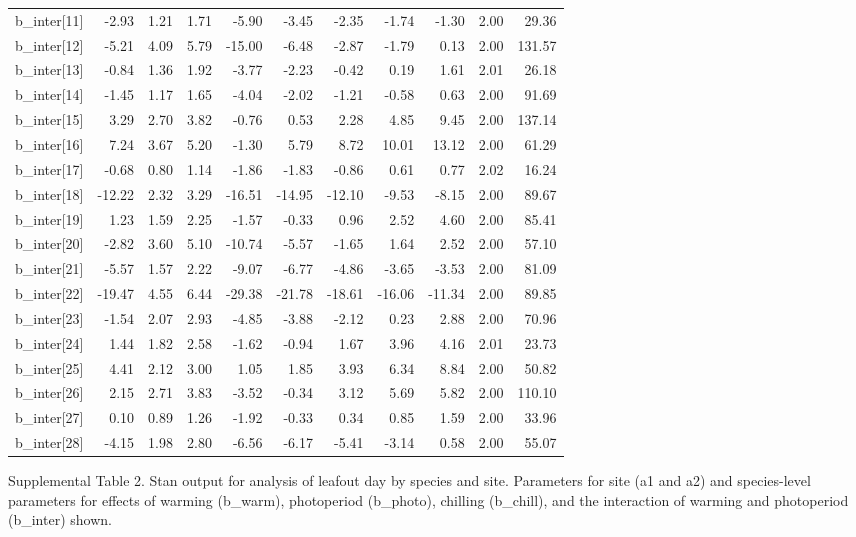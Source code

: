\documentclass[11pt]{article}
\begin{document}
\begin{table}[ht]
\begin{tabular}{rrrrrrrrrrr}
  b\_inter[11] & -2.93 & 1.21 & 1.71 & -5.90 & -3.45 & -2.35 & -1.74 & -1.30 & 2.00 & 29.36 \\ 
  b\_inter[12] & -5.21 & 4.09 & 5.79 & -15.00 & -6.48 & -2.87 & -1.79 & 0.13 & 2.00 & 131.57 \\ 
  b\_inter[13] & -0.84 & 1.36 & 1.92 & -3.77 & -2.23 & -0.42 & 0.19 & 1.61 & 2.01 & 26.18 \\ 
  b\_inter[14] & -1.45 & 1.17 & 1.65 & -4.04 & -2.02 & -1.21 & -0.58 & 0.63 & 2.00 & 91.69 \\ 
  b\_inter[15] & 3.29 & 2.70 & 3.82 & -0.76 & 0.53 & 2.28 & 4.85 & 9.45 & 2.00 & 137.14 \\ 
  b\_inter[16] & 7.24 & 3.67 & 5.20 & -1.30 & 5.79 & 8.72 & 10.01 & 13.12 & 2.00 & 61.29 \\ 
  b\_inter[17] & -0.68 & 0.80 & 1.14 & -1.86 & -1.83 & -0.86 & 0.61 & 0.77 & 2.02 & 16.24 \\ 
  b\_inter[18] & -12.22 & 2.32 & 3.29 & -16.51 & -14.95 & -12.10 & -9.53 & -8.15 & 2.00 & 89.67 \\ 
  b\_inter[19] & 1.23 & 1.59 & 2.25 & -1.57 & -0.33 & 0.96 & 2.52 & 4.60 & 2.00 & 85.41 \\ 
  b\_inter[20] & -2.82 & 3.60 & 5.10 & -10.74 & -5.57 & -1.65 & 1.64 & 2.52 & 2.00 & 57.10 \\ 
  b\_inter[21] & -5.57 & 1.57 & 2.22 & -9.07 & -6.77 & -4.86 & -3.65 & -3.53 & 2.00 & 81.09 \\ 
  b\_inter[22] & -19.47 & 4.55 & 6.44 & -29.38 & -21.78 & -18.61 & -16.06 & -11.34 & 2.00 & 89.85 \\ 
  b\_inter[23] & -1.54 & 2.07 & 2.93 & -4.85 & -3.88 & -2.12 & 0.23 & 2.88 & 2.00 & 70.96 \\ 
  b\_inter[24] & 1.44 & 1.82 & 2.58 & -1.62 & -0.94 & 1.67 & 3.96 & 4.16 & 2.01 & 23.73 \\ 
  b\_inter[25] & 4.41 & 2.12 & 3.00 & 1.05 & 1.85 & 3.93 & 6.34 & 8.84 & 2.00 & 50.82 \\ 
  b\_inter[26] & 2.15 & 2.71 & 3.83 & -3.52 & -0.34 & 3.12 & 5.69 & 5.82 & 2.00 & 110.10 \\ 
  b\_inter[27] & 0.10 & 0.89 & 1.26 & -1.92 & -0.33 & 0.34 & 0.85 & 1.59 & 2.00 & 33.96 \\ 
  b\_inter[28] & -4.15 & 1.98 & 2.80 & -6.56 & -6.17 & -5.41 & -3.14 & 0.58 & 2.00 & 55.07 \\ 
   \hline
\end{tabular}
\end{table}

Supplemental Table 2. Stan output for analysis of leafout day by species and site. Parameters for site (a1 and a2) and species-level parameters for effects of warming (b_warm), photoperiod (b_photo), chilling (b_chill), and the interaction of warming and photoperiod (b_inter) shown.
\end{document}
